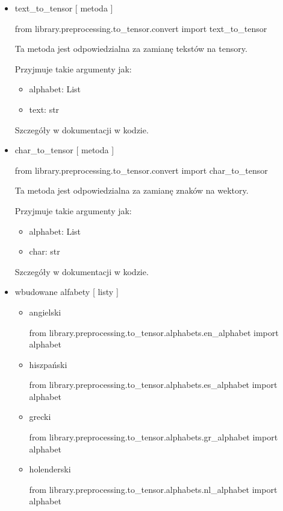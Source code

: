 \begin{itemize}

\item{text\_to\_tensor [ metoda ] }

\begin{import}
from library.preprocessing.to_tensor.convert import text_to_tensor
\end{import}
	
Ta metoda jest odpowiedzialna za zamianę tekstów na tensory.

Przyjmuje takie argumenty jak: 

\begin{itemize}
	\item alphabet: List
	\item text: str
\end{itemize}

Szczegóły w dokumentacji w kodzie.

\item{char\_to\_tensor [ metoda ] }
\begin{import}
from library.preprocessing.to_tensor.convert import char_to_tensor
\end{import}
Ta metoda jest odpowiedzialna za zamianę znaków na wektory.

Przyjmuje takie argumenty jak: 

\begin{itemize}
	\item alphabet: List
	\item char: str
\end{itemize}

Szczegóły w dokumentacji w kodzie.


\item{wbudowane alfabety [ listy ] }

\begin{itemize} 

\item angielski
\begin{import}
from library.preprocessing.to_tensor.alphabets.en_alphabet import alphabet
\end{import}


\item hiszpański
\begin{import}
from library.preprocessing.to_tensor.alphabets.es_alphabet import alphabet
\end{import}


\item grecki
\begin{import}
from library.preprocessing.to_tensor.alphabets.gr_alphabet import alphabet
\end{import}


\item holenderski
\begin{import}
from library.preprocessing.to_tensor.alphabets.nl_alphabet import alphabet
\end{import}
	
\end{itemize}

\end{itemize}


